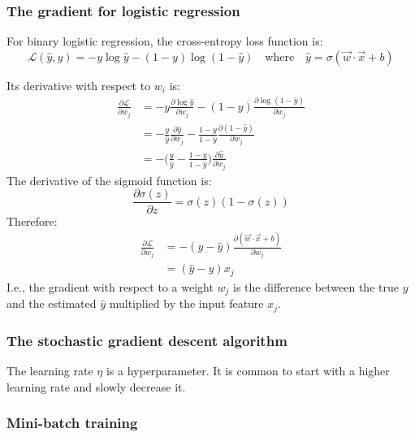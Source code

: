 \subsubsection{The gradient for logistic regression}

For binary logistic regression, the cross-entropy loss function is:
\begin{equation}
  \label{eqnBinaryCrossEntropy}
  \mathcal{L}(\hat{y}, y) = - y \log \hat{y} - (1 - y) \log (1 - \hat{y})
  \quad \text{where} \quad
  \hat{y} = \sigma(\vec{w} \cdot \vec{x} + b)
\end{equation}

Its derivative with respect to $w_i$ is:
\begin{align}
  \frac{\partial \mathcal{L}}{\partial w_j}
   & = - y \frac{\partial \log \hat{y}}{\partial w_j} - (1 - y) \frac{\partial \log (1 - \hat{y})}{\partial w_j}
  \\
   & = - \frac{y}{\hat{y}} \frac{\partial \hat{y}}{\partial w_j} - \frac{1 - y}{1 - \hat{y}} \frac{\partial (1 - \hat{y})}{\partial w_j}
  \\
   & = - \biggl( \frac{y}{\hat{y}} - \frac{1 - y}{1 - \hat{y}} \biggr) \frac{\partial \hat{y}}{\partial w_j}
\end{align}
The derivative of the sigmoid function is:
\begin{equation}
  \label{eqnSigmoidDerivative}
  \frac{\partial \sigma(z)}{\partial z} = \sigma(z) (1 - \sigma(z))
\end{equation}
Therefore:
\begin{align}
  \frac{\partial \mathcal{L}}{\partial w_j}
   & =  - (y - \hat{y}) \frac{\partial (\vec{w} \cdot \vec{x} + b)}{\partial w_j}
  \\
   & = (\hat{y} - y) x_j
\end{align}
I.e., the gradient with respect to a weight $w_j$ is the difference between the
true $y$ and the estimated $\hat{y}$ multiplied by the input feature $x_j$.

\subsubsection{The stochastic gradient descent algorithm}

The learning rate $\eta$ is a hyperparameter.
It is common to start with a higher learning rate and slowly decrease it.

\setcounter{subsubsection}{3}
\subsubsection{Mini-batch training}